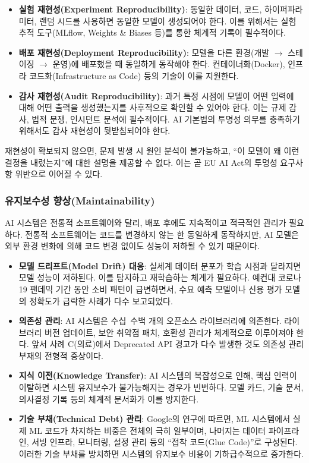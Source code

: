 \begin{itemize}
    \item \textbf{실험 재현성(Experiment Reproducibility)}: 동일한 데이터, 코드, 하이퍼파라미터, 랜덤 시드를 사용하면 동일한 모델이 생성되어야 한다. 이를 위해서는 실험 추적 도구(MLflow, Weights \& Biases 등)를 통한 체계적 기록이 필수적이다.
    \item \textbf{배포 재현성(Deployment Reproducibility)}: 모델을 다른 환경(개발 $\rightarrow$ 스테이징 $\rightarrow$ 운영)에 배포했을 때 동일하게 동작해야 한다. 컨테이너화(Docker), 인프라 코드화(Infrastructure as Code) 등의 기술이 이를 지원한다.
    \item \textbf{감사 재현성(Audit Reproducibility)}: 과거 특정 시점에 모델이 어떤 입력에 대해 어떤 출력을 생성했는지를 사후적으로 확인할 수 있어야 한다. 이는 규제 감사, 법적 분쟁, 인시던트 분석에 필수적이다. AI 기본법의 투명성 의무를 충족하기 위해서도 감사 재현성이 뒷받침되어야 한다.
\end{itemize}

재현성이 확보되지 않으면, 문제 발생 시 원인 분석이 불가능하고, ``이 모델이 왜 이런 결정을 내렸는지''에 대한 설명을 제공할 수 없다. 이는 곧 EU AI Act의 투명성 요구사항 위반으로 이어질 수 있다.

\subsubsection*{유지보수성 향상(Maintainability)}
AI 시스템은 전통적 소프트웨어와 달리, 배포 후에도 지속적이고 적극적인 관리가 필요하다. 전통적 소프트웨어는 코드를 변경하지 않는 한 동일하게 동작하지만, AI 모델은 외부 환경 변화에 의해 코드 변경 없이도 성능이 저하될 수 있기 때문이다.

\begin{itemize}
    \item \textbf{모델 드리프트(Model Drift) 대응}: 실세계 데이터 분포가 학습 시점과 달라지면 모델 성능이 저하된다. 이를 탐지하고 재학습하는 체계가 필요하다. 예컨대 코로나19 팬데믹 기간 동안 소비 패턴이 급변하면서, 수요 예측 모델이나 신용 평가 모델의 정확도가 급락한 사례가 다수 보고되었다.
    \item \textbf{의존성 관리}: AI 시스템은 수십~수백 개의 오픈소스 라이브러리에 의존한다. 라이브러리 버전 업데이트, 보안 취약점 패치, 호환성 관리가 체계적으로 이루어져야 한다. 앞서 사례 C(의료)에서 Deprecated API 경고가 다수 발생한 것도 의존성 관리 부재의 전형적 증상이다.
    \item \textbf{지식 이전(Knowledge Transfer)}: AI 시스템의 복잡성으로 인해, 핵심 인력이 이탈하면 시스템 유지보수가 불가능해지는 경우가 빈번하다. 모델 카드, 기술 문서, 의사결정 기록 등의 체계적 문서화가 이를 방지한다.
    \item \textbf{기술 부채(Technical Debt) 관리}: Google의 연구\cite{sculley2015hidden}에 따르면, ML 시스템에서 실제 ML 코드가 차지하는 비중은 전체의 극히 일부이며, 나머지는 데이터 파이프라인, 서빙 인프라, 모니터링, 설정 관리 등의 ``접착 코드(Glue Code)''로 구성된다. 이러한 기술 부채를 방치하면 시스템의 유지보수 비용이 기하급수적으로 증가한다.
\end{itemize}

